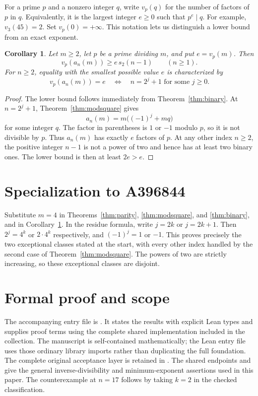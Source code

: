 \documentclass[11pt,a4paper]{article}
\newtheorem{corollary}[theorem]{Corollary}
\theoremstyle{remark}\newtheorem{remark}[theorem]{Remark}
\begin{document}
For a prime $p$ and a nonzero integer $q$, write $v_p(q)$ for the number
of factors of $p$ in $q$. Equivalently, it is the largest integer $e\ge0$
such that $p^e\mid q$. For example, $v_3(45)=2$. Set $v_p(0)=+\infty$.
This notation lets us distinguish a lower bound from an exact exponent.

\begin{corollary}\label{cor:valuation}
Let $m\ge2$, let $p$ be a prime dividing $m$, and put $e=v_p(m)$. Then
\[
 v_p(a_n(m))\ge e\,s_2(n-1)\qquad(n\ge1).
\]
For $n\ge2$, equality with the smallest possible value $e$ is characterized by
\begin{equation}\label{eq:minval}
 v_p(a_n(m))=e
 \quad\Longleftrightarrow\quad
 n=2^j+1\text{ for some }j\ge0.
\end{equation}
\end{corollary}

\begin{proof}
The lower bound follows immediately from Theorem~\ref{thm:binary}.
At $n=2^j+1$, Theorem~\ref{thm:modsquare} gives
\[
 a_n(m)=m\bigl((-1)^j+mq\bigr)
\]
for some integer $q$. The factor in parentheses is $1$ or $-1$ modulo $p$,
so it is not divisible by $p$. Thus $a_n(m)$ has exactly $e$ factors of $p$.
At any other index $n\ge2$, the positive integer $n-1$ is not a power
of two and hence has at least two binary ones. The lower bound is then
at least $2e>e$.
\end{proof}


\section{Specialization to A396844}
Substitute $m=4$ in Theorems~\ref{thm:parity},
\ref{thm:modsquare}, and \ref{thm:binary}, and in
Corollary~\ref{cor:valuation}. In the residue formula, write
$j=2k$ or $j=2k+1$. Then $2^j=4^k$ or $2\cdot4^k$ respectively,
and $(-1)^j=1$ or $-1$. This proves precisely the two exceptional
classes stated at the start, with every other index handled by the
second case of Theorem~\ref{thm:modsquare}. The powers of two are
strictly increasing, so these exceptional classes are disjoint.

\section{Formal proof and scope}
The accompanying entry file is .
It states the results with explicit Lean types and supplies proof terms
using the complete shared implementation included in the collection.
The manuscript is self-contained mathematically; the Lean entry file uses
those ordinary library imports rather than duplicating the full foundation.
The complete original acceptance layer is retained in . The shared endpoints 
and  give the general
inverse-divisibility and minimum-exponent assertions used in this paper.
The counterexample at $n=17$ follows by taking $k=2$ in the checked
 classification.
\end{document}

